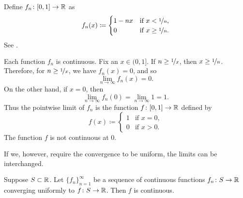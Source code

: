\begin{example}
Define $f_n \colon [0,1] \to {\mathbb{R}}$ as
\begin{equation*}
f_n(x) \coloneqq
\begin{cases}
1-nx &  \text{if } x < \nicefrac{1}{n},\\
0 &  \text{if } x \geq \nicefrac{1}{n}.
\end{cases}
\end{equation*}
See .

\begin{myfigureht}
\caption{Graph of $f_n(x)$.%
\label{contconvcntr:fig}}
\end{myfigureht}

Each function $f_n$ is continuous.
Fix an $x \in (0,1]$.  If $n \geq \nicefrac{1}{x}$,
then $x \geq \nicefrac{1}{n}$.  Therefore, for $n \geq \nicefrac{1}{x}$,
we have $f_n(x) = 0$, and so
\begin{equation*}
\lim_{n \to \infty} f_n(x) = 0.
\end{equation*}
On the other hand, if $x=0$, then
\begin{equation*}
\lim_{n \to \infty} f_n(0) = 
\lim_{n \to \infty} 1 = 1.
\end{equation*}
Thus the pointwise limit of $f_n$ is the function
$f \colon [0,1] \to {\mathbb{R}}$ defined by
\begin{equation*}
f(x) \coloneqq
\begin{cases}
1 &  \text{if } x = 0,\\
0 &  \text{if } x > 0.
\end{cases}
\end{equation*}
The function $f$ is not continuous at 0.
\end{example}

If we, however, require the convergence to be uniform, the limits can
be interchanged.

\begin{thm}
Suppose $S \subset {\mathbb{R}}$.
Let $\{ f_n \}_{n=1}^\infty$ be 
a sequence of continuous functions $f_n \colon S \to {\mathbb{R}}$ converging
uniformly to  $f \colon S \to {\mathbb{R}}$.  Then $f$ is continuous.
\end{thm}

